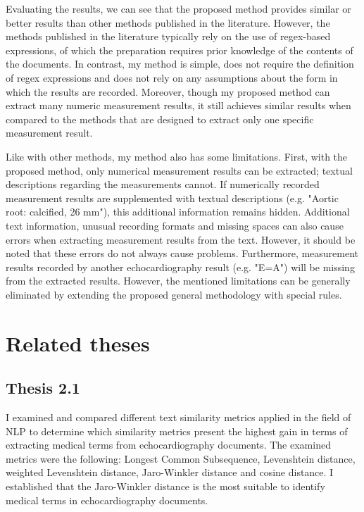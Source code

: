 Evaluating the results, we can see that the proposed method provides similar or better results than other methods published in the literature. However, the methods published in the literature typically rely on the use of regex-based expressions, of which the preparation requires prior knowledge of the contents of the documents. In contrast, my method is simple, does not require the definition of regex expressions and does not rely on any assumptions about the form in which the results are recorded. Moreover, though my proposed method can extract many numeric measurement results, it still achieves similar results when compared to the methods that are designed to extract only one specific measurement result.

Like with other methods, my method also has some limitations. First, with the proposed method, only numerical measurement results can be extracted; textual descriptions regarding the measurements cannot. If numerically recorded measurement results are supplemented with textual descriptions (e.g. "Aortic root: calcified, 26 mm"), this additional information remains hidden. Additional text information, unusual recording formats and missing spaces can also cause errors when extracting measurement results from the text. However, it should be noted that these errors do not always cause problems. Furthermore, measurement results recorded by another echocardiography result (e.g. "E=A") will be missing from the extracted results. However, the mentioned limitations can be generally eliminated by extending the proposed general methodology with special rules. 

\section{Related theses}

\subsection*{Thesis 2.1}

I examined and compared different text similarity metrics applied in the field of NLP to determine which similarity metrics present the highest gain in terms of extracting medical terms from echocardiography documents. The examined metrics were the following: Longest Common Subsequence, Levenshtein distance, weighted Levenshtein distance, Jaro-Winkler distance and cosine distance. I established that the Jaro-Winkler distance is the most suitable to identify medical terms in echocardiography documents.

